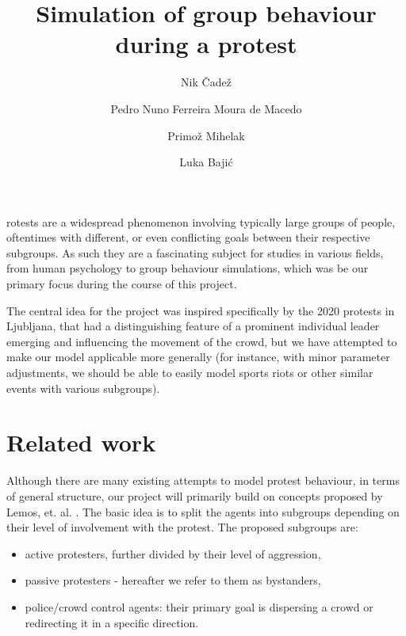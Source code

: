 \documentclass[9pt]{pnas-new}
\title{Simulation of group behaviour during a protest}
\author{Nik Čadež}
\author{Pedro Nuno Ferreira Moura de Macedo}
\author{Primož Mihelak}
\author{Luka Bajić}
\affil{Collective behaviour course research seminar report}
\begin{document}
\verticaladjustment{-2pt}

\maketitle
\thispagestyle{firststyle}

rotests are a widespread phenomenon involving typically large groups of people, oftentimes with different, or even conflicting goals between their respective subgroups. As such they are a fascinating subject for studies in various fields, from human psychology to group behaviour simulations, which was be our primary focus during the course of this project. 

\bigskip
The central idea for the project was inspired specifically by the 2020 protests in Ljubljana, that had a distinguishing feature of a prominent individual leader emerging and influencing the movement of the crowd, but we have attempted to make our model applicable more generally (for instance, with minor parameter adjustments, we should be able to easily model sports riots or other similar events with various subgroups).  

\section*{Related work}

Although there are many existing attempts to model protest behaviour, in terms of general structure, our project will primarily build on concepts proposed by Lemos, et. al. \cite{protests}. The basic idea is to split the agents into subgroups depending on their level of involvement with the protest. The proposed subgroups are:
\begin{itemize}
    \item active protesters, further divided by their level of aggression, 
    \item passive protesters - hereafter we refer to them as bystanders,
    \item police/crowd control agents: their primary goal is dispersing a crowd or redirecting it in a specific direction.
\end{itemize}
\end{document}

